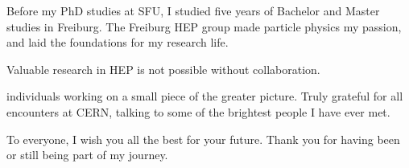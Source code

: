 Before my PhD studies at SFU, I studied five years of Bachelor and Master studies in Freiburg. 
The Freiburg HEP group made particle physics my passion, and laid the foundations for my research life.


Valuable research in HEP is not possible without collaboration. 

individuals working on a small piece of the greater picture. Truly grateful for all encounters at CERN, talking to some of the brightest people I have ever met. 



To everyone, I wish you all the best for your future. Thank you for having been or still being part of my journey. 
